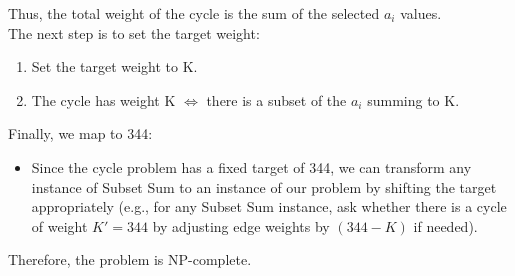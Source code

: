 Thus, the total weight of the cycle is the sum of the selected $a_i$ values.
\\ The next step is to set the target weight:
\begin{enumerate} \item Set the target weight to K. \item The cycle has weight K $\iff$ there is a subset of the $a_i$ summing to K. \end{enumerate}
Finally, we map to 344:
\begin{itemize} \item Since the cycle problem has a fixed target of 344, we can transform any instance of Subset Sum to an instance of our problem by shifting the target appropriately (e.g., for any Subset Sum instance, ask whether there is a cycle of weight $K' = 344$ by adjusting edge weights by $(344 - K)$ if needed). \end{itemize}
Therefore, the problem is NP-complete.